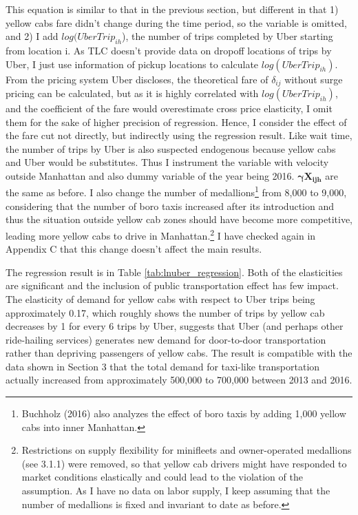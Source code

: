 \noindent This equation is similar to that in the previous section, but different in that 1) yellow cabs fare didn't change during the time period, so the variable is omitted, and 2) I add $log(UberTrip_{ih}$), the number of trips completed by Uber starting from location i. As TLC doesn't provide data on dropoff locations of trips by Uber, I just use information of pickup locations to calculate $log(UberTrip_{ih})$. From the pricing system Uber discloses, the theoretical fare of $\delta_{ij}$ without surge pricing can be calculated, but as it is highly correlated with $log(UberTrip_{ih})$, and the coefficient of the fare would overestimate cross price elasticity, I omit them for the sake of higher precision of regression. Hence, I consider the effect of the fare cut not directly, but indirectly using the regression result. Like wait time, the number of trips by Uber is also suspected endogenous because yellow cabs and Uber would be substitutes. Thus I instrument the variable with velocity outside Manhattan and also dummy variable of the year being 2016. $\mathbf{\bm{\gamma} X_{ijh}}$ are the same as before. I also change the number of medallions\footnote{Buchholz (2016) also analyzes the effect of boro taxis by adding 1,000 yellow cabs into inner Manhattan.} from 8,000 to 9,000, considering that the number of boro taxis increased after its introduction and thus the situation outside yellow cab zones should have become more competitive, leading more yellow cabs to drive in Manhattan.\footnote{Restrictions on supply flexibility for minifleets and owner-operated medallions (see 3.1.1) were removed, so that yellow cab drivers might have responded to market conditions elastically and could lead to the violation of the assumption. As I have no data on labor supply, I keep assuming that the number of medallions is fixed and invariant to date as before.} I have checked again in Appendix C that this change doesn't affect the main results.





The regression result is in Table \ref{tab:lnuber_regression}. Both of the elasticities are significant and the inclusion of public transportation effect has few impact. The elasticity of demand for yellow cabs with respect to Uber trips being approximately 0.17, which roughly shows the number of trips by yellow cab decreases by 1 for every 6 trips by Uber, suggests that Uber (and perhaps other ride-hailing services) generates new demand for door-to-door transportation rather than depriving passengers of yellow cabs. The result is compatible with the data shown in Section 3 that the total demand for taxi-like transportation actually increased from approximately 500,000 to 700,000 between 2013 and 2016.


